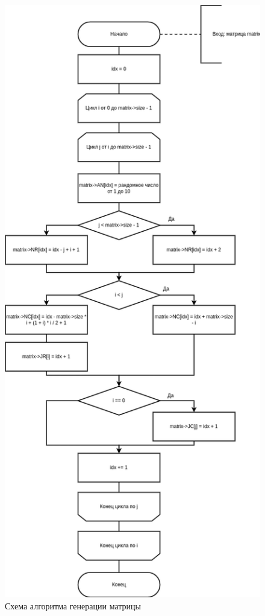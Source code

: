 \begin{figure}[H]
	\begin{center}
		\includegraphics[scale=0.47]{img/creation.png}
	\end{center}
	\captionsetup{justification=centering}
	\caption{Схема алгоритма генерации матрицы}
	\label{img:creation}
\end{figure}

